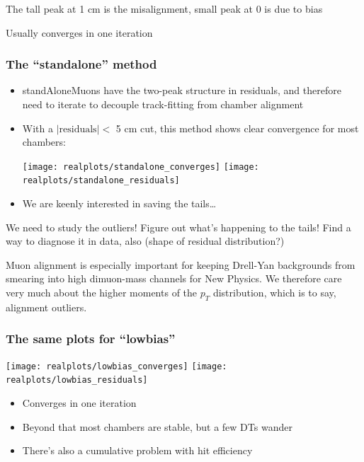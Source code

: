 \documentclass[compress]{beamer}
\begin{document}
\begin{notes}
\item The tall peak at 1 cm is the misalignment, small peak at 0 is due to bias
\item Usually converges in one iteration
\end{notes}

\begin{frame}
\frametitle{The ``standalone'' method}
\begin{itemize}
\item standAloneMuons have the two-peak structure in residuals, and therefore need to iterate to decouple track-fitting from chamber alignment
\item With a $|\mbox{residuals}| <$ 5 cm cut, this method shows clear convergence for most chambers:
\begin{center}
\texttt{[image: realplots/standalone\_converges]}
\texttt{[image: realplots/standalone\_residuals]}
\end{center}

\item We are keenly interested in saving the tails\ldots
\end{itemize}
\end{frame}

\begin{notes}
\item We need to study the outliers!  Figure out what's happening to
the tails!  Find a way to diagnose it in data, also (shape of residual
distribution?)

\item Muon alignment is especially important for keeping Drell-Yan
backgrounds from smearing into high dimuon-mass channels for New
Physics.  We therefore care very much about the higher moments of the
$p_T$ distribution, which is to say, alignment outliers.
\end{notes}

\begin{frame}
\frametitle{The same plots for ``lowbias''}
\begin{center}
\texttt{[image: realplots/lowbias\_converges]}
\texttt{[image: realplots/lowbias\_residuals]}
\end{center}
\begin{itemize}
\item Converges in one iteration
\item Beyond that most chambers are stable, but a few DTs wander
\item There's also a cumulative problem with hit efficiency
\end{itemize}
\end{frame}
\end{document}
